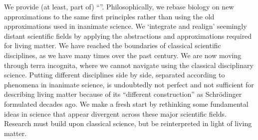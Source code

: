 We provide (at least, part of) “”. Philosophically, we rebase biology on new approximations
to the same first principles rather than using the old approximations
used in inanimate science.
We ‘integrate and realign’ seemingly distant scientific fields by applying the abstractions and approximations required for living matter. We have reached the boundaries of classical scientific disciplines, as we have many times over the past century. We are now moving through terra incognita, where we cannot navigate using the classical disciplinary science. Putting different disciplines side by side, separated according to phenomena in inanimate science, is undoubtedly not perfect and not sufficient for describing living matter because of its “different construction” as Schrödinger formulated \cite{Schrodinger:1992} decades ago. We make a fresh start by rethinking some fundamental ideas in science \cite{VeghNonOrdinaryLawsForLife:2025} that appear divergent across these major scientific fields. Research must build upon classical science, but be reinterpreted in light of living matter.

